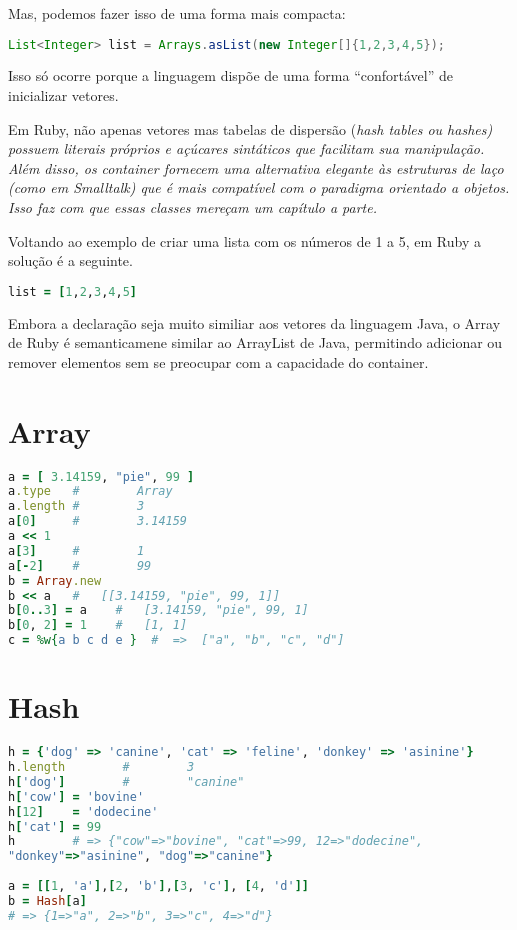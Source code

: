 \documentclass[serif,mathserif]{book}
\begin{document}
Mas, podemos fazer isso de uma forma mais compacta:
\begin{lstlisting}[language=Java]
List<Integer> list = Arrays.asList(new Integer[]{1,2,3,4,5});
\end{lstlisting}
Isso só ocorre porque a linguagem dispõe de uma forma ``confortável'' de inicializar vetores.

Em Ruby, não apenas vetores mas tabelas de dispersão (\em{hash tables} ou \em{hashes}) possuem literais próprios e 
açúcares sintáticos que facilitam sua manipulação. Além disso,
os container fornecem uma alternativa elegante às estruturas de laço (como em Smalltalk) que é mais compatível com o 
paradigma orientado a objetos. Isso faz com que essas classes mereçam um capítulo a parte.

Voltando ao exemplo de criar uma lista com os números de 1 a 5, em Ruby a solução é a seguinte.
\begin{lstlisting}[language=ruby]
list = [1,2,3,4,5]
\end{lstlisting}
Embora a declaração seja muito similiar aos vetores da linguagem Java, o Array de Ruby é semanticamene 
similar  ao ArrayList de Java, permitindo adicionar ou remover elementos sem se preocupar com a capacidade do container.

   
\section{Array}
\begin{lstlisting}[language=ruby]
a = [ 3.14159, "pie", 99 ]
a.type   #        Array
a.length #        3
a[0]     #        3.14159
a << 1
a[3]     #        1
a[-2]    #        99
b = Array.new
b << a   #   [[3.14159, "pie", 99, 1]]
b[0..3] = a    #   [3.14159, "pie", 99, 1]
b[0, 2] = 1    #   [1, 1]
c = %w{a b c d e }  #  =>  ["a", "b", "c", "d"]
\end{lstlisting}


\section{Hash}
\begin{lstlisting}[language=ruby]
h = {'dog' => 'canine', 'cat' => 'feline', 'donkey' => 'asinine'}
h.length        #        3
h['dog']        #        "canine"
h['cow'] = 'bovine'
h[12]    = 'dodecine'
h['cat'] = 99
h        # => {"cow"=>"bovine", "cat"=>99, 12=>"dodecine",
"donkey"=>"asinine", "dog"=>"canine"}
  
a = [[1, 'a'],[2, 'b'],[3, 'c'], [4, 'd']]
b = Hash[a]
# => {1=>"a", 2=>"b", 3=>"c", 4=>"d"}
\end{lstlisting}
\end{document}
